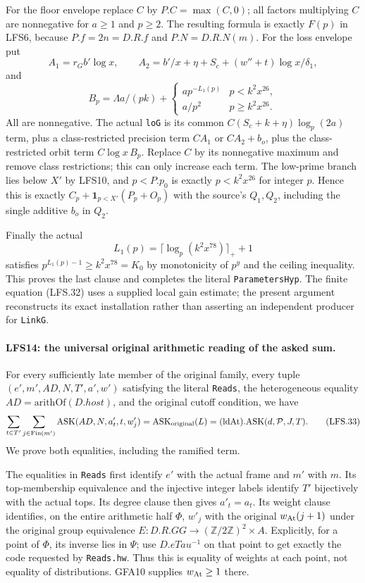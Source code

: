 For the floor envelope replace $C$ by $P.C=\max(C,0)$;
all factors multiplying $C$ are nonnegative for $a\ge1$ and
$p\ge2$.  The resulting formula is exactly $F(p)$ in LFS6,
because $P.f=2n=D.R.f$ and $P.N=D.R.N(m)$.
For the loss envelope put
\[
 A_1=r_Gb'\log x,\qquad
 A_2=b'/x+\eta+S_c+(w''+t)\log x/\delta_1,
\]
and
\[
 B_p=\Lambda a/(pk)+
       \begin{cases}ap^{-L_1(p)}&p<k^2x^{26},\\a/p^2&p\ge k^2x^{26}.
       \end{cases}
\]
All are nonnegative.  The actual \texttt{loG} is its common
$C(S_c+k+\eta)\log_p(2a)$ term, plus a class-restricted
precision term $CA_1$ or $CA_2+b_o$, plus the class-restricted
orbit term $C\log x\,B_p$.  Replace $C$ by its nonnegative
maximum and remove class restrictions; this can only increase
each term.  The low-prime branch lies below $X'$ by LFS10,
and $p<P.p_0$ is exactly $p<k^2x^{26}$ for integer $p$.
Hence this is exactly
$C_p+\mathbf1_{p<X'}(P_p+O_p)$ with the source's $Q_1,Q_2$,
including the single additive $b_o$ in $Q_2$.

Finally the actual
\[
 L_1(p)=\lceil\log_p(k^2x^{78})\rceil_++1
\]
satisfies $p^{L_1(p)-1}\ge k^2x^{78}=K_0$ by monotonicity
of $p^y$ and the ceiling inequality.  This proves the last
clause and completes the literal \texttt{ParametersHyp}.
The finite equation (LFS.32) uses a supplied local gain estimate;
the present argument reconstructs its exact installation rather
than asserting an independent producer for \texttt{LinkG}.

\paragraph{LFS14: the universal original arithmetic reading of the asked sum.}
\label{claim:LFS14}
For every sufficiently late member of the original family,
every tuple $(e',m',AD,N,T',a',w')$ satisfying the literal
\texttt{Reads}, the heterogeneous equality
$AD=\mathrm{arithOf}(D.host)$, and the original cutoff condition,
we have
\[
 \sum_{t\in T'}\sum_{j\in\mathrm{Fin}(m')}
     \mathrm{ASK}(AD,N,a'_t,t,w'_j)
 =\mathrm{ASK}_{\rm original}(L)
 =(\mathrm{ldAt}).\mathrm{ASK}(d,\mathcal P,J,T).             \tag{LFS.33}
\]
We prove both equalities, including the ramified term.

The equalities in \texttt{Reads} first identify $e'$ with
the actual frame and $m'$ with $m$.  Its top-membership
equivalence and the injective integer labels identify $T'$
bijectively with the actual tops.  Its degree clause then gives
$a'_t=a_t$.  Its weight clause identifies, on the entire
arithmetic half $\Phi$, $w'_j$ with the original
$w_{\rm At}(j+1)$ under the original group equivalence
$E:D.R.GG\longrightarrow (\mathbb Z/2\mathbb Z)^2\times A$.
Explicitly, for a point of $\Phi$, its inverse lies in
$\Psi$; use $D.eTau^{-1}$ on that point to get exactly the
code requested by \texttt{Reads.hw}.  Thus this is equality
of weights at each point, not equality of distributions.
GFA10 supplies $w_{\rm At}\ge1$ there.

